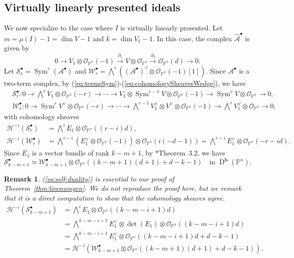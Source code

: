 \documentclass[11pt,letterpaper,reqno]{amsart}
\newcommand{\Sym}{\operatorname{Sym}}
\renewcommand{\det}{\operatorname{det}}
\newcommand{\mc}[1]{\mathcal{#1}}
\def\PP{{\mathbb P}}
\def\lra{\longrightarrow}
\newtheorem{remark}[theorem]{Remark}
\theoremstyle{definition}
\numberwithin{equation}{section}
\begin{document}
\subsection{Virtually linearly presented ideals}\label{sec:vlp}
We now specialize to the case where $I$ is virtually linearly presented. Let $m = \mu(I) - 1 = \dim V - 1$ and $k = \dim V_1 - 1$. In this case, the complex $\widehat{\mc{A}}^\bullet$ is given by
\[0 \lra V_1 \otimes \mc{O}_{\PP^n}(-1) \overset{\partial_1}{\lra} V \otimes \mc{O}_{\PP^n} \overset{\partial_0}{\lra} \mc{O}_{\PP^n}(d) \lra 0.\]
Let $\mc{S}^\bullet_r = \Sym^r(\mc{A}^\bullet)$ and $\mc{W}^\bullet_r = \bigwedge^r\left( (\mc{A}^\bullet)^\vee \otimes \mc{O}_{\PP^n}(-1) [1]\right)$. Since $\mc{A}^\bullet$ is a two-term complex, by (\ref{eq:termsSym})-(\ref{eq:cohomologySheavesWedge}), we have
\begin{align*}
    &\mc{S}^\bullet_r \colon 0 \lra \bigwedge^r V_1 \otimes \mc{O}_{\PP^n}(-r) \lra \cdots \lra V_1 \otimes \Sym^{r-1}V \otimes \mc{O}_{\PP^n}(-1) \lra \Sym^r V \otimes \mc{O}_{\PP^n} \lra 0,\\
    &\mc{W}^\bullet_r \colon 0 \lra \Sym^r V^\vee \otimes \mc{O}_{\PP^n}(-r)\lra \cdots \lra \bigwedge^{r-1}V_1^\vee \otimes V^\vee \otimes \mc{O}_{\PP^n}(-1) \lra \bigwedge^r V_1^\vee\otimes \mc{O}_{\PP^n} \lra 0,
\end{align*}
with cohomology sheaves
\begin{align*}
    \mc{H}^{-i}(\mc{S}^\bullet_r) &= \bigwedge^i E_1 \otimes \mc{O}_{\PP^n}((r-i)d),\\
    \mc{H}^{-i}(\mc{W}^\bullet_r) &= \bigwedge^{r-i} (E_1^\vee\otimes \mc{O}_{\PP^n}(-1)) \otimes \mc{O}_{\PP^n}(i(-d-1)) = \bigwedge^{r-i}E^\vee_1 \otimes \mc{O}_{\PP^n}(-r-id).
\end{align*}
Since $E_1$ is a vector bundle of rank $k-m+1$, by \cite{RSWY}*{Theorem~3.2}, we have
\begin{equation}\label{eq:self-duality}
    \mc{S}^\bullet_{k-m+1} \simeq \mc{W}^\bullet_{k-m+1} \otimes \mc{O}_{\PP^n}((k-m+1)(d+1)+d-k-1) \quad \text{in }\operatorname{D}^{\mathbf{b}}(\PP^n).
\end{equation}
\begin{remark}
    (\ref{eq:self-duality}) is essential to our proof of Theorem~\ref{thm:lownumgen}. We do not reproduce the proof here, but we remark that it is a direct computation to show that the cohomology sheaves agree.
    \begin{align*}
        \mc{H}^{-i}(\mc{S}^\bullet_{k-m+1}) &= \bigwedge^i E_1 \otimes \mc{O}_{\PP^n}((k-m-i+1)d) \\
        &= \bigwedge^{k-m-i+1} E_1^\vee \otimes \det(E_1) \otimes \mc{O}_{\PP^n}((k-m-i+1)d)\\
        &= \bigwedge^{k-m-i+1} E_1^\vee \otimes \mc{O}_{\PP^n}((k-m-i+1)d + d - k - 1)\\
        &= \mc{H}^{-i}(\mc{W}^\bullet_{k-m+1} \otimes \mc{O}_{\PP^n}((k-m+1)(d+1)+d-k-1)).
    \end{align*}
\end{remark}
\end{document}
